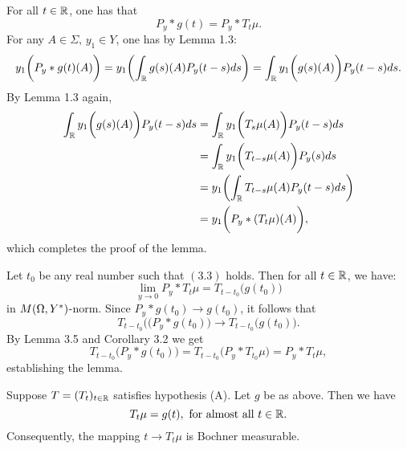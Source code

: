   For all $t\in \Bbb R$, one has that
$$ P_y\ast g(t) = P_y \ast T_t\mu.$$\endproclaim
\prf For any $A\in \Sigma,\,y_1 \in Y$, one has by Lemma 1.3:
$$ y_1\biggl( P_y\ast g(t) (A)\biggr) = y_1\biggl( \int_{\Bbb R} g(s)(A)
P_y(t-s)ds\biggr) =\int_{\Bbb R} y_1\biggl(  g(s)(A)\biggr)  P_y(t-s)ds.$$
By Lemma 1.3 again,
$$\split \int_{\R} y_1\biggl(  g(s)(A)\biggr)  P_y(t-s)ds
&=\int_{\R} y_1\biggl(  T_s\mu(A)\biggr)  P_y(t-s)ds\\
&=\int_{\R} y_1\biggl(T_{t-s} \mu(A)\biggr)  P_y(s)ds\\
&=y_1\biggl( \int_{\R} T_{t-s} \mu (A) P_y(t-s)ds\biggr)\\
&=y_1\biggl( P_y\ast (T_t\mu)(A)\biggr),\endsplit$$
which completes the proof of the lemma.\endprf

 Let $t_0$ be any real number such that $(3.3)$
holds. Then
for all $t\in{\Bbb R}$, we have:
$$ \lim_{y\to 0} P_y\ast T_t\mu = T_{t-t_0} \biggl(g(t_0)\biggr)$$
 in $M(\Omega, Y^*)$-norm.\endproclaim
   \prf Since $P_y\ast g(t_0) \to g(t_0)$, it follows that
$$ T_{t-t_0} \biggl( (P_y\ast g(t_0)\biggr) \to
T_{t-t_0}\biggl(g(t_0)\biggr).$$
By Lemma 3.5 and Corollary 3.2 we get
$$T_{t-t_0} \biggl( P_y \ast g(t_0)\biggr) = T_{t-t_0} \biggl( P_y\ast
T_{t_0}\mu \biggr)= P_y\ast T_t \mu,$$
establishing the lemma. \endprf



 Suppose $T=(T_t)_{t \in \Bbb R}$
satisfies hypothesis (A). Let $g$ be as
above. Then we have
$$T_t \mu = g(t),\,\, \text{for almost all } t \in \Bbb R. $$
Consequently, the mapping $t\to T_t\mu$ is Bochner
measurable.\endproclaim

